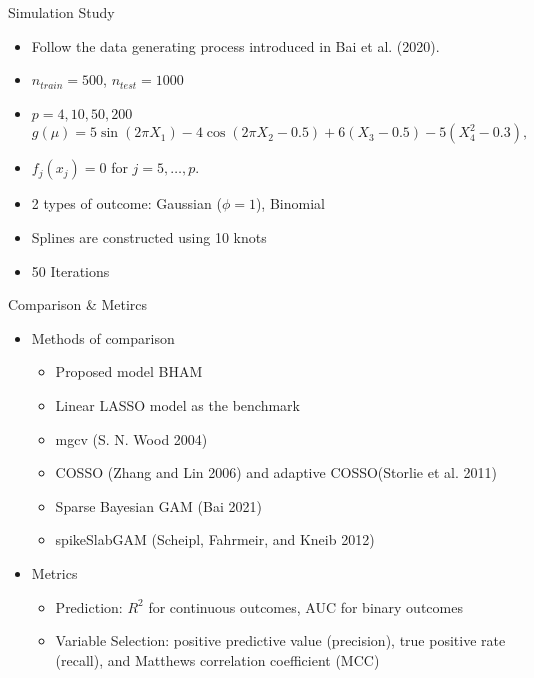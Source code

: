\documentclass[
  ignorenonframetext,
  aspectratio=169]{beamer}
\providecommand{\tightlist}{%
  \setlength{\itemsep}{0pt}\setlength{\parskip}{0pt}}
\begin{document}
\begin{frame}{Simulation Study}
\protect\hypertarget{simulation-study}{}
\begin{itemize}
\item
  Follow the data generating process introduced in Bai et al. (2020).
\item
  \(n_{train} = 500\), \(n_{test}=1000\)
\item
  \(p=4, 10, 50, 200\) \[
  g(\mu) = 5 \sin(2\pi X_1) - 4 \cos(2\pi X_2 -0.5) + 6(X_3-0.5) - 5(X_4^2 -0.3),
  \]
\item
  \(f_j(x_j) = 0\) for \(j = 5, \dots, p\).
\item
  2 types of outcome: Gaussian (\(\phi=1\)), Binomial
\item
  Splines are constructed using 10 knots
\item
  50 Iterations
\end{itemize}
\end{frame}

\begin{frame}{Comparison \& Metircs}
\protect\hypertarget{comparison-metircs}{}
\begin{itemize}
\tightlist
\item
  Methods of comparison

  \begin{itemize}
  \tightlist
  \item
    Proposed model BHAM
  \item
    Linear LASSO model as the benchmark
  \item
    mgcv (S. N. Wood 2004)
  \item
    COSSO (Zhang and Lin 2006) and adaptive COSSO(Storlie et al. 2011)
  \item
    Sparse Bayesian GAM (Bai 2021)
  \item
    spikeSlabGAM (Scheipl, Fahrmeir, and Kneib 2012)
  \end{itemize}
\item
  Metrics

  \begin{itemize}
  \tightlist
  \item
    Prediction: \(R^2\) for continuous outcomes, AUC for binary outcomes
  \item
    Variable Selection: positive predictive value (precision), true
    positive rate (recall), and Matthews correlation coefficient (MCC)
  \end{itemize}
\end{itemize}
\end{frame}
\end{document}
